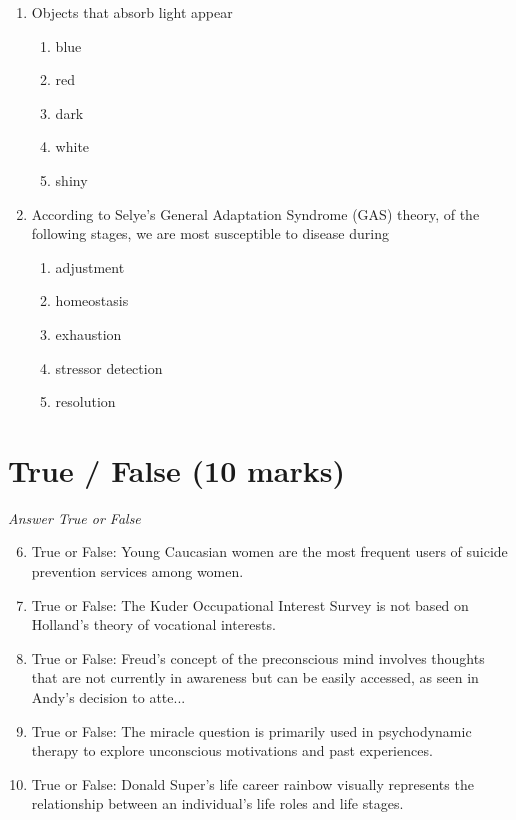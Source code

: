 \documentclass[12pt]{article}
\begin{document}
\begin{enumerate}[label=\arabic*.]
\begin{enumerate}[label=(\alph*)]
    \item Enhanced cognitive development exclusively due to nutrient composition
\end{enumerate}
\item Objects that absorb light appear
\begin{enumerate}[label=(\alph*)]
    \item blue
    \item red
    \item dark
    \item white
    \item shiny
\end{enumerate}
\item According to Selye's General Adaptation Syndrome (GAS) theory, of the following stages, we are most susceptible to disease during
\begin{enumerate}[label=(\alph*)]
    \item adjustment
    \item homeostasis
    \item exhaustion
    \item stressor detection
    \item resolution
\end{enumerate}
\end{enumerate}

\section*{True / False (10 marks)}
\textit{Answer True or False}
\begin{enumerate}[label=\arabic*.]
\setcounter{enumi}{5}
\item True or False: Young Caucasian women are the most frequent users of suicide prevention services among women.
\item True or False: The Kuder Occupational Interest Survey is not based on Holland's theory of vocational interests.
\item True or False: Freud's concept of the preconscious mind involves thoughts that are not currently in awareness but can be easily accessed, as seen in Andy's decision to atte...
\item True or False: The miracle question is primarily used in psychodynamic therapy to explore unconscious motivations and past experiences.
\item True or False: Donald Super's life career rainbow visually represents the relationship between an individual's life roles and life stages.
\end{enumerate}
\end{document}
